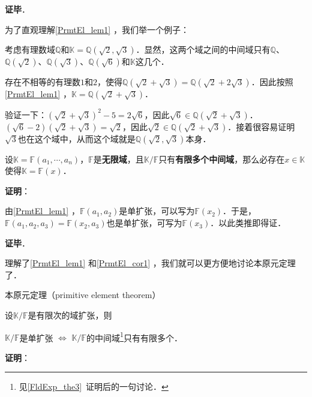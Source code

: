\textbf{证毕}．


为了直观理解\autoref{PrmtEl_lem1} ，我们举一个例子：

\begin{example}{}

考虑有理数域$\mathbb{Q}$和$\mathbb{K}=\mathbb{Q}(\sqrt{2}, \sqrt{3})$．显然，这两个域之间的中间域只有$\mathbb{Q}$、$\mathbb{Q}(\sqrt{2})$、$\mathbb{Q}(\sqrt{3})$、$\mathbb{Q}(\sqrt{6})$和$\mathbb{K}$这几个．

存在不相等的有理数$1$和$2$，使得$\mathbb{Q}(\sqrt{2}+\sqrt{3})=\mathbb{Q}(\sqrt{2}+2\sqrt{3})$．因此按照\autoref{PrmtEl_lem1} ，$\mathbb{K}=\mathbb{Q}(\sqrt{2}+\sqrt{3})$．

验证一下：$(\sqrt{2}+\sqrt{3})^2-5=2\sqrt{6}$，因此$\sqrt{6}\in\mathbb{Q}(\sqrt{2}+\sqrt{3})$．$(\sqrt{6}-2)(\sqrt{2}+\sqrt{3})=\sqrt{2}$，因此$\sqrt{2}\in\mathbb{Q}(\sqrt{2}+\sqrt{3})$．接着很容易证明$\sqrt{3}$也在这个域中，从而这个域就是$\mathbb{Q}(\sqrt{2}, \sqrt{3})$本身．

\end{example}


\begin{corollary}{}\label{PrmtEl_cor1}
设$\mathbb{K}=\mathbb{F}(a_1, \cdots, a_n)$，$\mathbb{F}$是\textbf{无限域}，且$\mathbb{K}/\mathbb{F}$只有\textbf{有限多个中间域}，那么必存在$x\in\mathbb{K}$使得$\mathbb{K}=\mathbb{F}(x)$．
\end{corollary}

\textbf{证明}：

由\autoref{PrmtEl_lem1} ，$\mathbb{F}(a_1, a_2)$是单扩张，可以写为$\mathbb{F}(x_2)$．于是，$\mathbb{F}(a_1, a_2, a_3)=\mathbb{F}(x_2, a_3)$也是单扩张，可写为$\mathbb{F}(x_3)$．以此类推即得证．

\textbf{证毕}．


理解了\autoref{PrmtEl_lem1} 和\autoref{PrmtEl_cor1} ，我们就可以更方便地讨论本原元定理了．




\begin{theorem}{本原元定理（primitive element theorem）}\label{PrmtEl_the1}

设$\mathbb{K}/\mathbb{F}$是有限次的域扩张，则

$\mathbb{K}/\mathbb{F}$是单扩张 $\iff$ $\mathbb{K}/\mathbb{F}$的中间域\footnote{见\autoref{FldExp_the3}~证明后的一句讨论．}只有有限多个．

\end{theorem}

\textbf{证明}：

